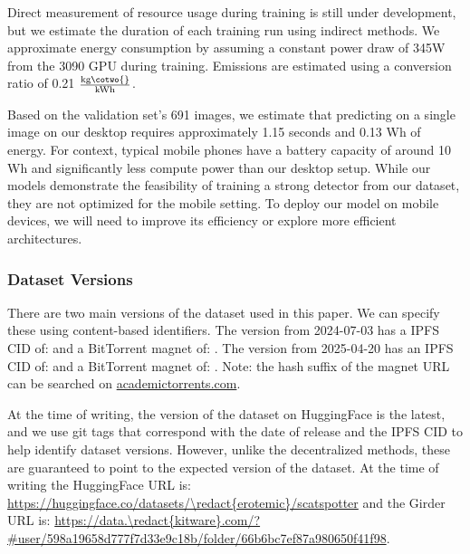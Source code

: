 Direct measurement of resource usage during training is still under development, but we estimate the
  duration of each training run using indirect methods.
We approximate energy consumption by assuming a constant power draw of 345W from the 3090 GPU during
  training.
Emissions are estimated using a conversion ratio of 0.21 $\frac{\textrm{kg}\cotwo{}}{\textrm{kWh}}$.
  
Based on the validation set's 691 images, we estimate that predicting on a single image on our desktop
  requires approximately 1.15 seconds and 0.13 Wh of energy.
For context, typical mobile phones have a battery capacity of around 10 Wh and significantly less compute
  power than our desktop setup.
While our models demonstrate the feasibility of training a strong detector from our dataset, they are not
  optimized for the mobile setting.
To deploy our model on mobile devices, we will need to improve its efficiency or explore more efficient
  architectures.



\subsubsection{Dataset Versions}

There are two main versions of the dataset used in this paper. We can specify
these using content-based identifiers. The version from 2024-07-03 has a IPFS CID of: 
\texttt{} 
and a BitTorrent magnet of: 
\texttt{}.
The version from 2025-04-20 has an IPFS CID of: 
\texttt{} 
and a BitTorrent magnet of: 
\texttt{}.
Note: the hash suffix of the magnet URL can be searched on \url{academictorrents.com}.


At the time of writing, the version of the dataset on HuggingFace is the latest, and we use git tags that
  correspond with the date of release and the IPFS CID to help identify dataset versions.
However, unlike the decentralized methods, these are guaranteed to point to the expected version of the
  dataset.
At the time of writing the HuggingFace URL is:
\url{https://huggingface.co/datasets/\redact{erotemic}/scatspotter} and the Girder URL is:
\url{https://data.\redact{kitware}.com/?#user/598a19658d777f7d33e9c18b/folder/66b6bc7ef87a980650f41f98}.

